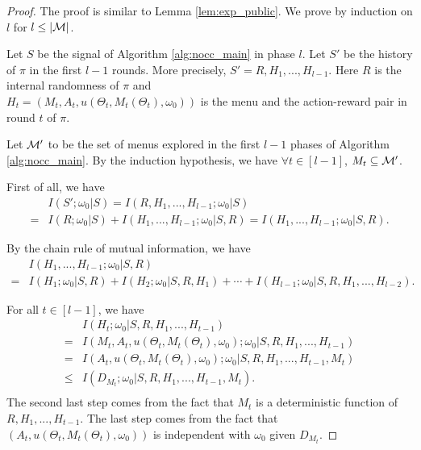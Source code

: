 \begin{proof}
The proof is similar to Lemma \ref{lem:exp_public}. We prove by induction on $l$ for $l \leq |\mathcal{M}|$.


Let $S$ be the signal of Algorithm \ref{alg:nocc_main} in phase $l$. Let $S'$ be the history of $\pi$ in the first $l-1$ rounds. More precisely, $S' = R, H_1,...,H_{l-1}$. Here $R$ is the internal randomness of $\pi$ and \\$H_t = (M_t, A_t,u(\Theta_t, M_t(\Theta_t), \omega_0))$ is the menu and the action-reward pair in round $t$ of $\pi$.

Let $\mathcal{M}'$ to be the set of menus explored in the first $l-1$ phases of Algorithm \ref{alg:nocc_main}. By the induction hypothesis, we have $\forall t\in[l-1]$, $M_t \subseteq \mathcal{M}'$.

First of all, we have
\begin{align*}
&I(S'; \omega_0| S) = I(R,H_1,...,H_{l-1}; \omega_0| S)  \\
= &I(R; \omega_0| S) + I(H_1,...,H_{l-1}; \omega_0|S, R) = I(H_1,...,H_{l-1}; \omega_0|S, R).
\end{align*}

By the chain rule of mutual information, we have
\begin{align*}
& I(H_1,...,H_{l-1}; \omega_0|S, R) \\
 =& I(H_1;\omega_0|S,R) + I(H_2;\omega_0|S, R ,H_1) + \cdots + I(H_{l-1}; \omega_0|S,R,H_1,...,H_{l-2}).
\end{align*}

For all $t \in [l-1]$, we have
\begin{align*}
&I(H_t; \omega_0|S,R,H_1,...,H_{t-1}) \\
=& I(M_t,A_t, u(\Theta_t, M_t(\Theta_t), \omega_0); \omega_0|S,R,H_1,...,H_{t-1}) \\
=& I(A_t, u(\Theta_t, M_t(\Theta_t), \omega_0); \omega_0 | S,R,H_1,...,H_{t-1}, M_t)\\
\leq& I(D_{M_t}; \omega_0|S,R,H_1,...,H_{t-1},M_t). \\
\end{align*}
The second last step comes from the fact that $M_t$ is a deterministic function of $R,H_1,...,H_{t-1}$. The last step comes from the fact that $(A_t,u(\Theta_t, M_t(\Theta_t), \omega_0))$ is independent with $\omega_0$ given $D_{M_t}$.


\end{proof}
